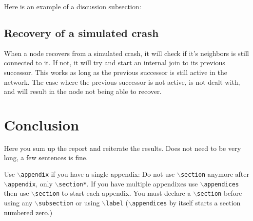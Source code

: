 \documentclass[conference]{IEEEtran}
\begin{document}
\bigskip

Here is an example of a discussion subsection:

\subsection{Recovery of a simulated crash}
\label{Subsection:Recovery_simulated_crash}
When a node recovers from a simulated crash, it will check if it's neighbors is still connected to it. If not, it will try and start an internal join to its previous successor. This works as long as the previous successor is still active in the network. The case where the previous successor is not active, is not dealt with, and will result in the node not being able to recover.


\section{Conclusion}
\label{Section:Conclusion}
Here you sum up the report and reiterate the results. Does not need to be very long, a few sentences is fine.


\printbibliography

{
	Use $\backslash${\tt{appendix}} if you have a single appendix:
	Do not use $\backslash${\tt{section}} anymore after $\backslash${\tt{appendix}}, only $\backslash${\tt{section*}}.
	If you have multiple appendixes use $\backslash${\tt{appendices}} then use $\backslash${\tt{section}} to start each appendix.
	You must declare a $\backslash${\tt{section}} before using any $\backslash${\tt{subsection}} or using $\backslash${\tt{label}} ($\backslash${\tt{appendices}} by itself
	starts a section numbered zero.)}

\end{document}
